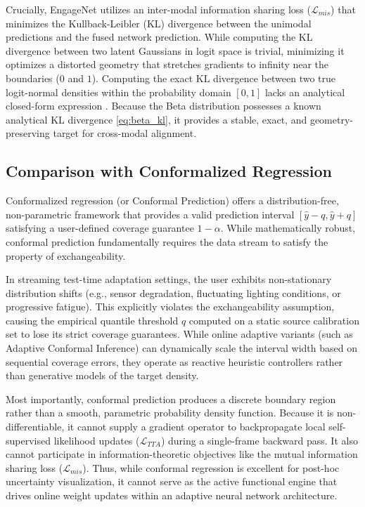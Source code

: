 \documentclass[10pt,a4paper,twocolumn]{article}
\begin{document}
	Crucially, EngageNet utilizes an inter-modal information sharing loss ($\mathcal{L}_{mis}$) that minimizes the Kullback-Leibler (KL) divergence between the unimodal predictions and the fused network prediction. While computing the KL divergence between two latent Gaussians in logit space is trivial, minimizing it optimizes a distorted geometry that stretches gradients to infinity near the boundaries ($0$ and $1$). Computing the exact KL divergence between two true logit-normal densities within the probability domain $[0,1]$ lacks an analytical closed-form expression \cite{aitchison1980}. Because the Beta distribution possesses a known analytical KL divergence \ref{eq:beta_kl}, it provides a stable, exact, and geometry-preserving target for cross-modal alignment.
	
	\subsection*{Comparison with Conformalized Regression}
	Conformalized regression (or Conformal Prediction) \cite{romano2019} offers a distribution-free, non-parametric framework that provides a valid prediction interval $[ \hat{y} - q, \hat{y} + q ]$ satisfying a user-defined coverage guarantee $1 - \alpha$. While mathematically robust, conformal prediction fundamentally requires the data stream to satisfy the property of exchangeability. 
	
	In streaming test-time adaptation settings, the user exhibits non-stationary distribution shifts (e.g., sensor degradation, fluctuating lighting conditions, or progressive fatigue). This explicitly violates the exchangeability assumption, causing the empirical quantile threshold $q$ computed on a static source calibration set to lose its strict coverage guarantees. While online adaptive variants (such as Adaptive Conformal Inference) \cite{gibbs2021} can dynamically scale the interval width based on sequential coverage errors, they operate as reactive heuristic controllers rather than generative models of the target density.
	
	Most importantly, conformal prediction produces a discrete boundary region rather than a smooth, parametric probability density function. Because it is non-differentiable, it cannot supply a gradient operator to backpropagate local self-supervised likelihood updates ($\mathcal{L}_{TTA}$) during a single-frame backward pass. It also cannot participate in information-theoretic objectives like the mutual information sharing loss ($\mathcal{L}_{mis}$). Thus, while conformal regression is excellent for post-hoc uncertainty visualization, it cannot serve as the active functional engine that drives online weight updates within an adaptive neural network architecture.
\end{document}
